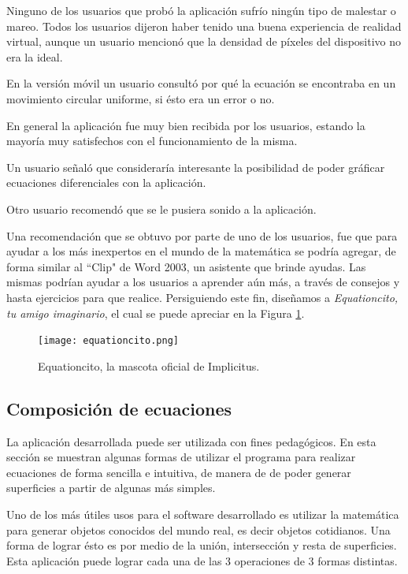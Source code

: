 \documentclass[12pt]{article}
\begin{document}
Ninguno de los usuarios que probó la aplicación sufrío ningún tipo de malestar o mareo. Todos los usuarios dijeron haber tenido una buena experiencia de realidad virtual, aunque un usuario mencionó que la densidad de píxeles del dispositivo no era la ideal.

En la versión móvil un usuario consultó por qué la ecuación se encontraba en un movimiento circular uniforme, si ésto era un error o no.

En general la aplicación fue muy bien recibida por los usuarios, estando la mayoría muy satisfechos con el funcionamiento de la misma.

Un usuario señaló que consideraría interesante la posibilidad de poder gráficar ecuaciones diferenciales con la aplicación. 

Otro usuario recomendó que se le pusiera sonido a la aplicación.

Una recomendación que se obtuvo por parte de uno de los usuarios, fue que para ayudar a los más inexpertos en el mundo de la matemática se podría agregar, de forma similar al ``Clip" de Word 2003, un asistente que brinde ayudas. Las mismas podrían ayudar a los usuarios a aprender aún más, a través de consejos y hasta ejercicios para que realice. Persiguiendo este fin, diseñamos a \textit{Equationcito, tu amigo imaginario}, el cual se puede apreciar en la Figura \ref{equationcito}.

\begin{figure}[h]
\texttt{[image: equationcito.png]}
\caption{Equationcito, la mascota oficial de Implicitus.}
\label{equationcito}
\end{figure}


\subsection{Composición de ecuaciones}
\noindent La aplicación desarrollada puede ser utilizada con fines pedagógicos. En esta sección se muestran algunas formas de utilizar el programa para  realizar ecuaciones de forma sencilla e intuitiva, de manera de de poder generar superficies a partir de algunas más simples.

Uno de los más útiles usos para el software desarrollado es utilizar la matemática para generar objetos conocidos del mundo real, es decir objetos cotidianos. Una forma de lograr ésto es por medio de la unión, intersección y resta de superficies. Esta aplicación puede lograr cada una de las 3 operaciones de 3 formas distintas.
\end{document}
